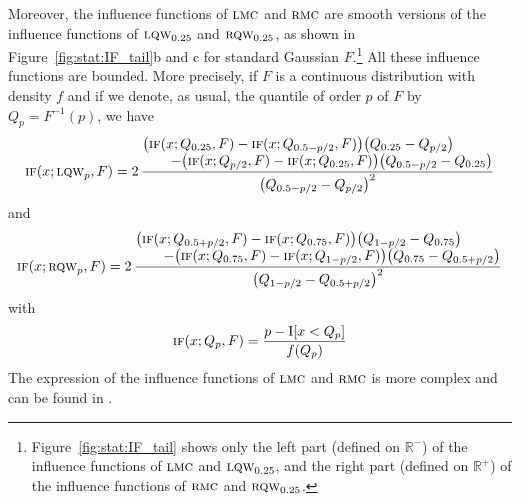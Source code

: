 Moreover, the influence functions of $\stsc{LMC}$ and $\stsc{RMC}$ are
smooth versions of the influence functions of $\stsc{LQW}_{0.25}$ and
$\stsc{RQW}_{0.25}$, as shown in Figure~\ref{fig:stat:IF_tail}b and c for
standard Gaussian $F$.\footnote{Figure~\ref{fig:stat:IF_tail} shows only the
left part (defined on ${\mathbb{R}}^{-}$) of the influence functions of
$\stsc{LMC}$ and $\stsc{LQW}_{0.25}$, and the right part (defined on
${\mathbb{R}}^{+}$) of the influence functions of $\stsc{RMC}$ and
$\stsc{RQW}_{0.25}$.} All these influence functions are bounded. More
precisely, if $F$ is a continuous distribution with density $f$ and if we
denote, as usual, the quantile of order $p$ of $F$ by $Q_p=F^{-1}(p)$, we have
\[
    \stsc{IF}(x; \stsc{LQW}_p, F) 
         = 2\, \frac{\begin{array}{@{}l@{}}
                    \left(\stsc{IF}(x; Q_{0.25}, F) - \stsc{IF}(x; Q_{0.5-p/2}, F)\right)
                                       \left(Q_{0.25} - Q_{p/2}\right)\\
                    \qquad - \left(\stsc{IF}(x; Q_{p/2}, F) - \stsc{IF}(x;Q_{0.25},F)\right) 
                                       \left(Q_{0.5-p/2} - Q_{0.25}\right)
                    \end{array}}
            {\left(Q_{0.5-p/2} - Q_{p/2}\right)^2}
\]
and
\[
    \stsc{IF}(x; \stsc{RQW}_p, F) 
         = 2\, \frac{\begin{array}{@{}l@{}}
                    \left(\stsc{IF}(x; Q_{0.5+p/2}, F) - \stsc{IF}(x; Q_{0.75}, F)\right)
                                       \left(Q_{1-p/2} - Q_{0.75}\right)\\
                    \qquad - \left(\stsc{IF}(x; Q_{0.75}, F) - \stsc{IF}(x;Q_{1-p/2},F)\right) 
                                       \left(Q_{0.75} - Q_{0.5+p/2}\right)
                    \end{array}}
            {\left(Q_{1-p/2} - Q_{0.5+p/2}\right)^2}
\]
with 
\[
    \stsc{IF}(x; Q_p, F) = \frac{p - \I[x<Q_p]}{f(Q_p)}
\]
The expression of the influence functions of $\stsc{LMC}$ and $\stsc{RMC}$
is more complex and can be found in \citet[p.~740--741]{brys:etal:2006}.        

